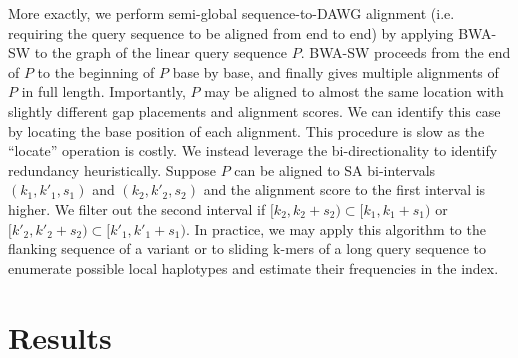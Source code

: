 \documentclass[webpdf,contemporary,large,namedate]{oup-authoring-template}%
\begin{document}
More exactly, we perform semi-global sequence-to-DAWG alignment (i.e. requiring the query sequence to be aligned from end to end)
by applying BWA-SW to the graph of the linear query sequence $P$.
BWA-SW proceeds from the end of $P$ to the beginning of $P$ base by base,
and finally gives multiple alignments of $P$ in full length.
Importantly, $P$ may be aligned to almost the same location with slightly different gap placements and alignment scores.
We can identify this case by locating the base position of each alignment.
This procedure is slow as the ``locate'' operation is costly.
We instead leverage the bi-directionality to identify redundancy heuristically.
Suppose $P$ can be aligned to SA bi-intervals $(k_1,k'_1,s_1)$ and $(k_2,k'_2,s_2)$ and the alignment score to the first interval is higher.
We filter out the second interval if $[k_2,k_2+s_2)\subset[k_1,k_1+s_1)$ or $[k'_2,k'_2+s_2)\subset[k'_1,k'_1+s_1)$.
In practice, we may apply this algorithm to the flanking sequence of a variant
or to sliding k-mers of a long query sequence to enumerate possible local haplotypes and estimate their frequencies in the index.

\section{Results}

\end{document}
